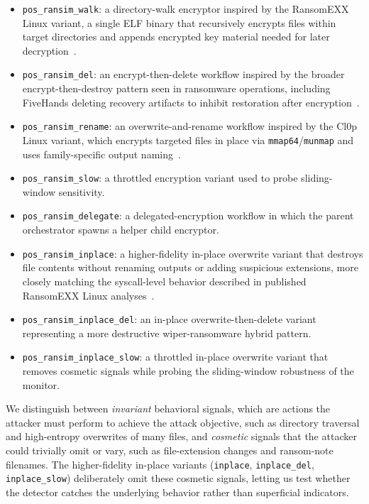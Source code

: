 \documentclass[twocolumn, 10pt]{scrartcl}
\begin{document}
\begin{itemize}
    \item \texttt{pos\_ransim\_walk}: a directory-walk encryptor inspired by the RansomEXX Linux variant, a single ELF binary that recursively encrypts files within target directories and appends encrypted key material needed for later decryption~\cite{kaspersky_ransomexx,profero_ransomexx}.
    \item \texttt{pos\_ransim\_del}: an encrypt-then-delete workflow inspired by the broader encrypt-then-destroy pattern seen in ransomware operations, including FiveHands deleting recovery artifacts to inhibit restoration after encryption~\cite{cisa_fivehands}.
    \item \texttt{pos\_ransim\_rename}: an overwrite-and-rename workflow inspired by the Cl0p Linux variant, which encrypts targeted files in place via \texttt{mmap64}/\texttt{munmap} and uses family-specific output naming~\cite{sentinelone_cl0p}.
    \item \texttt{pos\_ransim\_slow}: a throttled encryption variant used to probe sliding-window sensitivity.
    \item \texttt{pos\_ransim\_delegate}: a delegated-encryption workflow in which the parent orchestrator spawns a helper child encryptor.
    \item \texttt{pos\_ransim\_inplace}: a higher-fidelity in-place overwrite variant that destroys file contents without renaming outputs or adding suspicious extensions, more closely matching the syscall-level behavior described in published RansomEXX Linux analyses~\cite{profero_ransomexx}.
    \item \texttt{pos\_ransim\_inplace\_del}: an in-place overwrite-then-delete variant representing a more destructive wiper-ransomware hybrid pattern.
    \item \texttt{pos\_ransim\_inplace\_slow}: a throttled in-place overwrite variant that removes cosmetic signals while probing the sliding-window robustness of the monitor.
\end{itemize}

We distinguish between \emph{invariant} behavioral signals, which are actions the attacker must perform to achieve the attack objective, such as directory traversal and high-entropy overwrites of many files, and \emph{cosmetic} signals that the attacker could trivially omit or vary, such as file-extension changes and ransom-note filenames. The higher-fidelity in-place variants (\texttt{inplace}, \texttt{inplace\_del}, \texttt{inplace\_slow}) deliberately omit these cosmetic signals, letting us test whether the detector catches the underlying behavior rather than superficial indicators.
\end{document}
